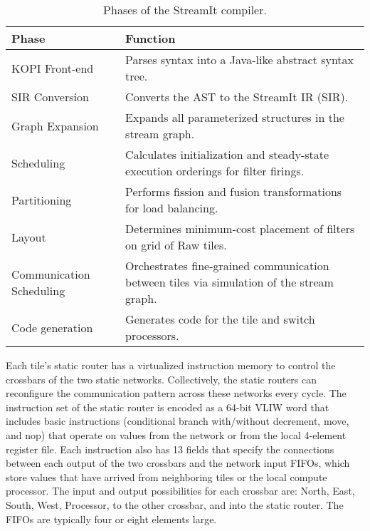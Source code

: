 \begin{table*}[t]
\begin{center}
\scriptsize
\begin{tabular}{|l|l|} \hline
{\bf Phase} & {\bf Function} \\
\hline \hline
KOPI Front-end & Parses syntax into a Java-like abstract syntax tree. \\
\hline
SIR Conversion & Converts the AST to the StreamIt IR (SIR). \\
\hline
Graph Expansion & Expands all parameterized structures in the stream graph. \\
\hline
Scheduling & Calculates initialization and steady-state execution orderings for filter firings. \\
\hline
Partitioning & Performs fission and fusion transformations for load balancing. \\
\hline
Layout & Determines minimum-cost placement of filters on grid of Raw tiles. \\
\hline
Communication Scheduling & Orchestrates fine-grained communication between tiles via simulation of the stream graph. \\
\hline
Code generation & Generates code for the tile and switch processors. \\
\hline
\end{tabular}
\vspace{-6pt}
\caption{\protect\small Phases of the StreamIt compiler.
\label{tab:phases}}
\vspace{-12pt}
\end{center}
\end{table*}

Each tile's static router has a virtualized instruction memory to
control the crossbars of the two static networks. Collectively, the
static routers can reconfigure the communication pattern across these
networks every cycle.  The instruction set of the static router is
encoded as a 64-bit VLIW word that includes basic instructions
(conditional branch with/without decrement, move, and nop) that
operate on values from the network or from the local 4-element
register file. Each instruction also has 13 fields that specify the
connections between each output of the two crossbars and the network
input FIFOs, which store values that have arrived from neighboring
tiles or the local compute processor.  The input and output
possibilities for each crossbar are: North, East, South, West,
Processor, to the other crossbar, and into the static router. The
FIFOs are typically four or eight elements large.

